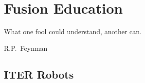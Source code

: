 \setchapterpreamble[u]{\margintoc}
\chapter{Fusion Education}\label{chap:Fusion Education}

\epigraph{What one fool could understand, another can.}{R.P.~Feynman}

\section{ITER Robots}

